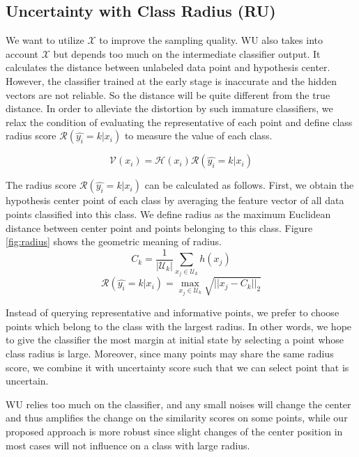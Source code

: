 \subsection{Uncertainty with Class Radius (RU)}
\label{sec:classradius}
We want to utilize $\mathcal{X}$ to improve the sampling quality. 
WU also takes into account $\mathcal{X}$ but depends too much on the 
intermediate classifier output. It calculates the distance
between unlabeled data point and hypothesis center. 
However, the classifier trained at the early stage
is inaccurate and the hidden vectors are not reliable. 
So the distance will be quite different from the true distance. 
In order to alleviate the distortion by such immature classifiers, we relax the condition of evaluating the representative of each point and define class radius score $\mathcal{R}(\hat{y_i}=k|x_i)$ to measure the value of each class. 
    
\begin{equation}
\mathcal{V}(x_i) = {\mathcal{H}(x_i)} {\mathcal{R}(\hat{y_i}=k|x_i)}
\end{equation}
    
The radius score $\mathcal{R}(\hat{y_i}=k|x_i)$ can be calculated as follows. First, we obtain the hypothesis center point of each class by averaging the feature vector of all data points classified into this class. We define radius as the maximum Euclidean distance between center point and points belonging to this class. Figure \ref{fig:radius} shows the geometric meaning of radius.
    \begin{equation}
        C_k = \frac{1}{|\mathcal{U}_k|} \sum_{x_j \in \mathcal{U}_k} h(x_j)
    \end{equation}
    \begin{equation}
        \mathcal{R}(\hat{y_i}=k|x_i) = \max_{x_j \in \mathcal{U}_k} \sqrt{||x_j - C_k||_2} 
    \end{equation}
    
Instead of querying representative and informative points, we prefer to choose points which belong to the class with the largest radius. 
In other words, we hope to give the classifier the most margin at initial state by selecting a point whose class radius is large. Moreover, since many points may share the same radius score, we combine it with uncertainty score such that we can select point that is uncertain.
    
WU relies too much on the classifier, and any small noises will change the center and thus amplifies the change on the similarity scores on some points, while our proposed approach is more robust since slight changes of the center position in most cases will not influence on a class with large radius.
    
